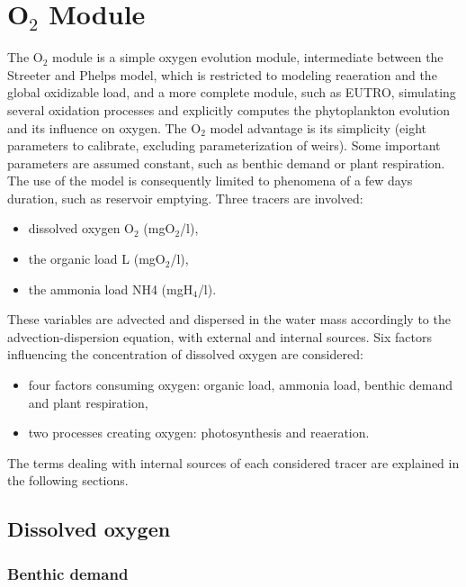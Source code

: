 \chapter{O$_2$ Module}

The O$_2$ module is a simple oxygen evolution module,
intermediate between the Streeter and Phelps
\cite{streeter_ohio_1925} model,
which is restricted to modeling reaeration and the global oxidizable load,
and a more complete module, such as EUTRO, simulating several oxidation processes
and explicitly computes the phytoplankton evolution and its influence on oxygen.
The O$_2$ model advantage is its simplicity
(eight parameters to calibrate, excluding parameterization of weirs).
Some important parameters are assumed constant, such as benthic demand or plant respiration.
The use of the model is consequently limited to phenomena of a few days duration,
such as reservoir emptying. Three tracers are involved:

\begin{itemize}
\item dissolved oxygen O$_2$ (mgO$_2$/l),
\item the organic load L (mgO$_2$/l),
\item the ammonia load NH4 (mgH$_4$/l).
\end{itemize}

These variables are advected and dispersed in the water mass accordingly
to the advection-dispersion equation, with external and internal sources.
Six factors influencing the concentration of dissolved oxygen are considered:

\begin{itemize}
\item four factors consuming oxygen: organic load, ammonia load,
  benthic demand and plant respiration,
\item two processes creating oxygen: photosynthesis and reaeration.
\end{itemize}

The terms dealing with internal sources of each considered tracer are explained
in the following sections.

\section{Dissolved oxygen}

\subsection{Benthic demand}

